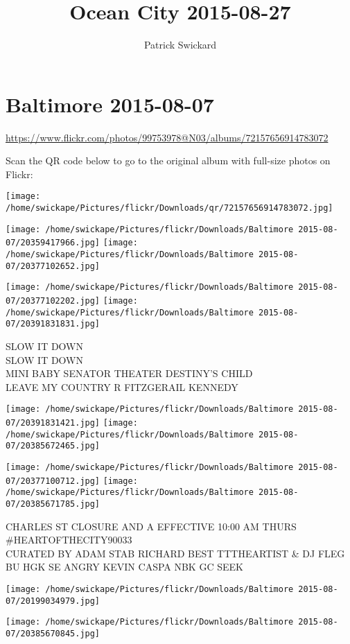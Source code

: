\documentclass[10pt,letterpaper]{article}
\title{Ocean City 2015-08-27}
\author{Patrick Swickard}
\date{}
\begin{document}
\section*{Baltimore 2015-08-07}

\url{https://www.flickr.com/photos/99753978@N03/albums/72157656914783072}

Scan the QR code below to go to the original album with full-size photos on Flickr:

\texttt{[image: /home/swickape/Pictures/flickr/Downloads/qr/72157656914783072.jpg]}
\pagebreak

\texttt{[image: /home/swickape/Pictures/flickr/Downloads/Baltimore 2015-08-07/20359417966.jpg]}
\texttt{[image: /home/swickape/Pictures/flickr/Downloads/Baltimore 2015-08-07/20377102652.jpg]}

\texttt{[image: /home/swickape/Pictures/flickr/Downloads/Baltimore 2015-08-07/20377102202.jpg]}
\texttt{[image: /home/swickape/Pictures/flickr/Downloads/Baltimore 2015-08-07/20391831831.jpg]}

SLOW IT DOWN\\
SLOW IT DOWN\\
MINI BABY SENATOR THEATER DESTINY'S CHILD\\
LEAVE MY COUNTRY R FITZGERAIL KENNEDY
\pagebreak

\texttt{[image: /home/swickape/Pictures/flickr/Downloads/Baltimore 2015-08-07/20391831421.jpg]}
\texttt{[image: /home/swickape/Pictures/flickr/Downloads/Baltimore 2015-08-07/20385672465.jpg]}

\texttt{[image: /home/swickape/Pictures/flickr/Downloads/Baltimore 2015-08-07/20377100712.jpg]}
\texttt{[image: /home/swickape/Pictures/flickr/Downloads/Baltimore 2015-08-07/20385671785.jpg]}

CHARLES ST CLOSURE AND A EFFECTIVE 10:00 AM THURS\\
\#HEARTOFTHECITY90033\\
CURATED BY ADAM STAB RICHARD BEST TTTHEARTIST \& DJ FLEG\\
BU HGK SE ANGRY KEVIN CASPA NBK GC SEEK
\pagebreak

\texttt{[image: /home/swickape/Pictures/flickr/Downloads/Baltimore 2015-08-07/20199034979.jpg]}

\vspace{0.25in}
\texttt{[image: /home/swickape/Pictures/flickr/Downloads/Baltimore 2015-08-07/20385670845.jpg]}
\end{document}
